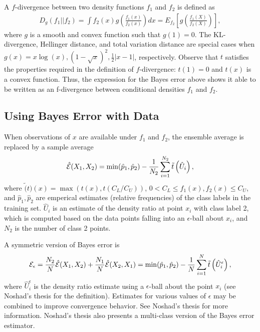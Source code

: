 \documentclass{article}
\begin{document}
A $f$-divergence between two density functions $f_1$ and $f_2$ is defined as
\begin{gather*}
D_g(f_1 || f_2) = \int f_2(x) g\left(\frac{f_1(x)}{f_2(x)} \right) dx = E_{f_2} \left[g\left(\frac{f_1(X)}{f_2(X)}\right)\right],
\end{gather*}
where $g$ is a smooth and convex function such that $g(1) = 0$.  The KL-divergence, Hellinger distance, and total variation distance are special cases when $g(x) = x \log(x), (1-\sqrt{x})^2, \frac{1}{2} |x-1|$, respectively.  Observe that $t$ satisfies the properties required in the definition of $f$-divergence: $t(1) = 0$ and $t(x)$ is a convex function.  Thus, the expression for the Bayes error above shows it able to be written as an f-divergence between conditional densities $f_1$ and $f_2$.

\subsection{Using Bayes Error with Data}

When observations of $x$ are available under $f_1$ and $f_2$, the ensemble average is replaced by a sample average
\begin{gather*}
\hat{{\cal E}}(X_1,X_2) = \min(\hat{p}_1, \hat{p}_2) - \frac{1}{N_2} \sum_{i=1}^{N_2} \tilde{t}\left(\hat{U}_i\right),
\end{gather*}
where $\tilde(t)(x) = \max(t(x),t(C_L/C_U))$, $0 < C_L \leq f_1(x), f_2(x) \leq C_U$, and $\hat{p}_1,\hat{p}_2$ are emperical estimates (relative frequencies) of the class labels in the training set.  $\hat{U}_i$ is an estimate of the density ratio at point $x_i$ with class label 2, which is computed based on the data points falling into an $\epsilon$-ball about $x_i$, and $N_2$ is the number of class 2 points.

A symmetric version of Bayes error is
\begin{gather*}
{\cal E}_\epsilon = \frac{N_2}{N} \hat{{\cal E}}(X_1,X_2) + \frac{N_1}{N}\hat{{\cal E}}(X_2,X_1) = \min(\hat{p}_1, \hat{p}_2) - \frac{1}{N} \sum_{i=1}^{N} \tilde{t}\left(\hat{U}_i^\epsilon\right),
\end{gather*}
where $\hat{U}_i^\epsilon$ is the density ratio estimate using a $\epsilon$-ball about the point $x_i$ (see Noshad's thesis for the definition).  Estimates for various values of $\epsilon$ may be combined to improve convergence behavior.  See Noshad's thesis for more information.
Noshad's thesis also presents a multi-class version of the Bayes error estimator.
\end{document}
